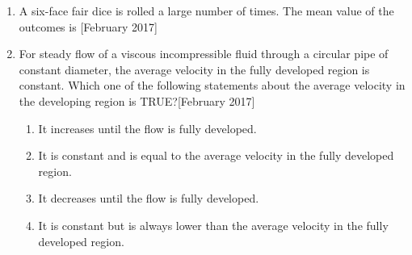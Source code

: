 \documentclass[journal]{IEEEtran}
\begin{document}
\begin{enumerate}
\item A six-face fair dice is rolled a large number of times. The mean value of the outcomes is \underline{\hspace{2cm}}\hfill[February 2017]
\item For steady flow of a viscous incompressible fluid through a circular pipe of constant diameter, the average velocity in the fully developed region is constant. Which one of the following statements about the average velocity in the developing region is TRUE?\hfill[February 2017]
\begin{enumerate}
    \item It increases until the flow is fully developed.
    \item It is constant and is equal to the average velocity in the fully developed region.
    \item It decreases until the flow is fully developed.
    \item It is constant but is always lower than the average velocity in the fully developed region.
\end{enumerate}


\end{enumerate}
\end{document}
